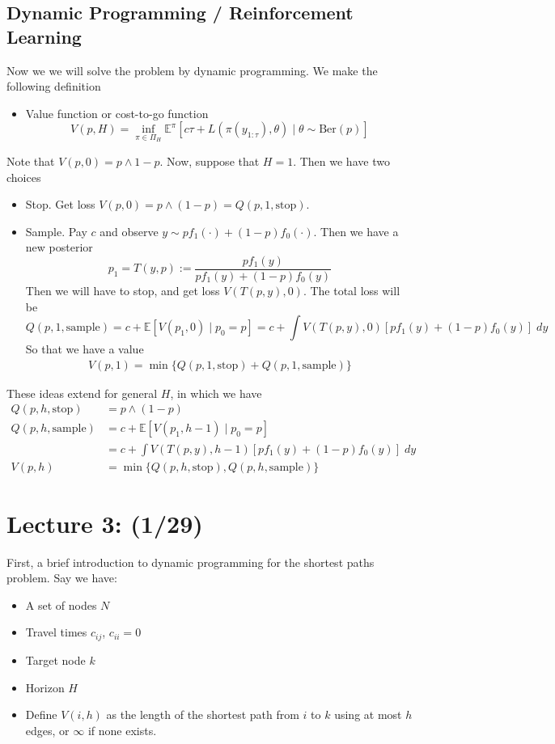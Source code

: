 \documentclass[pdftex,letterpaper,11pt]{article}
\theoremstyle{definition}
\theoremstyle{definition}
\theoremstyle{definition}
\newcommand{\EE}{\mathbb E}
\newcommand{\mrm}[1]{\mathrm{#1}}
\begin{document}
\subsection*{Dynamic Programming / Reinforcement Learning}

Now we we will solve the problem by dynamic programming. We make the following definition
\begin{itemize}
	\item Value function or cost-to-go function
		\[V(p, H) = \inf_{\pi \in \Pi_H} \EE^\pi[c\tau + L(\pi(y_{1:\tau}), \theta) \mid \theta \sim \mrm{Ber}(p)]\]
\end{itemize}
Note that $V(p, 0) = p \wedge 1-p$. Now, suppose that $H=1$. Then we have two choices
\begin{itemize}
	\item Stop. Get loss $V(p,0) = p \wedge (1-p) = Q(p, 1, \mrm{stop})$.
	\item Sample. Pay $c$ and observe $y \sim pf_1(\cdot) + (1-p)f_0(\cdot)$. Then we have a new posterior
		\[p_1 = T(y,p) := \frac{pf_1(y)}{pf_1(y) + (1-p)f_0(y)}\]
		Then we will have to stop, and get loss $V(T(p,y), 0)$. The total loss will be 
		\[Q(p, 1, \mrm{sample}) = c + \EE[V(p_1, 0) \mid p_0 = p] = c + \int V(T(p,y), 0)[pf_1(y) + (1-p)f_0(y)]\; dy\]
		So that we have a value
		\begin{align*}
		V(p, 1) = \min\{Q(p, 1, \mrm{stop}) + Q(p, 1, \mrm{sample})\}
		\end{align*}
\end{itemize}
These ideas extend for general $H$, in which we have
\begin{align*}
	Q(p, h, \mrm{stop}) & = p \wedge (1-p)\\
	Q(p, h, \mrm{sample}) & = c + \EE[V(p_1, h-1) \mid p_0 = p]\\
	& = c + \int V(T(p,y), h-1)[pf_1(y) + (1-p)f_0(y)]\; dy\\
	V(p, h) & = \min\{ Q(p, h, \mrm{stop}), Q(p, h, \mrm{sample})\}
\end{align*}

\section*{Lecture 3: (1/29)}

First, a brief introduction to dynamic programming for the shortest paths problem. Say we have: 
\begin{itemize}
	\item A set of nodes $N$
	\item Travel times $c_{ij}$, $c_{ii} = 0$
	\item Target node $k$
	\item Horizon $H$
	\item Define $V(i,h)$ as the length of the shortest path from $i$ to $k$ using at most $h$ edges, or $\infty$ if none exists.
\end{itemize}
\end{document}
